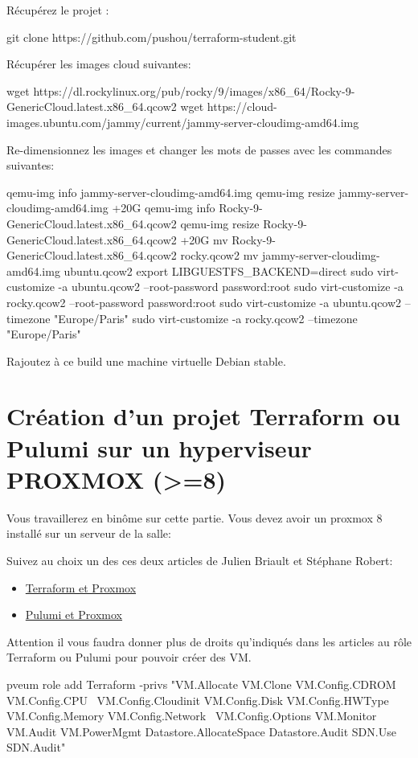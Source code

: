 Récupérez le projet :
\begin{bashcode}
git clone https://github.com/pushou/terraform-student.git  
\end{bashcode}

Récupérer les images cloud suivantes:

\begin{bashcode}
wget https://dl.rockylinux.org/pub/rocky/9/images/x86_64/Rocky-9-GenericCloud.latest.x86_64.qcow2
wget https://cloud-images.ubuntu.com/jammy/current/jammy-server-cloudimg-amd64.img
\end{bashcode}

Re-dimensionnez les images et changer les mots de passes avec les commandes suivantes:
\begin{bashcode}
qemu-img info jammy-server-cloudimg-amd64.img
qemu-img resize jammy-server-cloudimg-amd64.img +20G
qemu-img info Rocky-9-GenericCloud.latest.x86_64.qcow2
qemu-img resize  Rocky-9-GenericCloud.latest.x86_64.qcow2 +20G 
mv Rocky-9-GenericCloud.latest.x86_64.qcow2 rocky.qcow2
mv jammy-server-cloudimg-amd64.img ubuntu.qcow2 
export LIBGUESTFS_BACKEND=direct
sudo virt-customize -a ubuntu.qcow2 --root-password password:root
sudo virt-customize -a rocky.qcow2 --root-password password:root
sudo virt-customize -a ubuntu.qcow2 --timezone "Europe/Paris"
sudo virt-customize -a rocky.qcow2 --timezone "Europe/Paris"
\end{bashcode}

Rajoutez à ce build une machine virtuelle Debian stable.

\section{Création d'un projet Terraform ou Pulumi sur un hyperviseur PROXMOX (>=8)}
Vous travaillerez en binôme sur cette partie.
Vous devez avoir un proxmox 8 installé sur un serveur de la salle:

Suivez au choix un des ces deux articles de Julien Briault et Stéphane Robert:
\begin{itemize}

  \item \href{https://blog.stephane-robert.info/docs/virtualiser/type1/proxmox/terraform/}{Terraform et Proxmox}
  \item \href{https://blog.jbriault.fr/pulumi-proxmox-cloudinit/}{Pulumi et Proxmox}
\end{itemize}
 
Attention il vous faudra donner plus de droits qu'indiqués dans les articles au rôle Terraform ou Pulumi 
pour pouvoir créer des VM.

\begin{bashcode}
  pveum role add Terraform -privs "VM.Allocate VM.Clone VM.Config.CDROM VM.Config.CPU \
  VM.Config.Cloudinit VM.Config.Disk VM.Config.HWType VM.Config.Memory VM.Config.Network \
  VM.Config.Options VM.Monitor VM.Audit VM.PowerMgmt Datastore.AllocateSpace Datastore.Audit SDN.Use SDN.Audit"
\end{bashcode}

